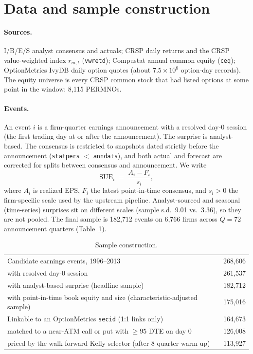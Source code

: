 \documentclass[11pt]{article}
\theoremstyle{definition}
\newcommand{\1}{\mathbf{1}}
\begin{document}
\section{Data and sample construction}\label{sec:data}

\paragraph{Sources.} I/B/E/S analyst consensus and actuals; CRSP daily returns and the CRSP
value-weighted index $r_{m,t}$ (\texttt{vwretd}); Compustat annual common equity
(\texttt{ceq}); OptionMetrics IvyDB daily option quotes (about $7.5\times10^8$ option-day
records). The equity universe is every CRSP common stock that had listed options at some
point in the window: 8{,}115 PERMNOs.

\paragraph{Events.} An event $i$ is a firm-quarter earnings announcement with a resolved
day-0 session (the first trading day at or after the announcement). The surprise is
analyst-based. The consensus is restricted to snapshots dated strictly before the
announcement (\texttt{statpers} $<$ \texttt{anndats}), and both actual and forecast are
corrected for splits between consensus and announcement. We write
\begin{equation}
  \mathrm{SUE}_i \;=\; \frac{A_i - F_i}{s_i},
\end{equation}
where $A_i$ is realized EPS, $F_i$ the latest point-in-time consensus, and $s_i>0$ the
firm-specific scale used by the upstream pipeline. Analyst-sourced and seasonal
(time-series) surprises sit on different scales (sample s.d.\ 9.01 vs.\ 3.36), so they are
not pooled. The final sample is 182{,}712 events on 6{,}766 firms across $Q=72$ announcement
quarters (Table~\ref{tab:sample}).

\begin{table}[h]\centering\small
\caption{Sample construction.}\label{tab:sample}
\begin{tabular}{lr}
\toprule
Candidate earnings events, 1996--2013 & 268{,}606 \\
\quad with resolved day-0 session & 261{,}537 \\
\quad with analyst-based surprise (headline sample) & 182{,}712 \\
\quad with point-in-time book equity and size (characteristic-adjusted sample) & 175{,}016 \\
Linkable to an OptionMetrics \texttt{secid} (1:1 links only) & 164{,}673 \\
\quad matched to a near-ATM call or put with $\geq 95$ DTE on day 0 & 126{,}008 \\
\quad priced by the walk-forward Kelly selector (after 8-quarter warm-up) & 113{,}927 \\
\bottomrule
\end{tabular}
\end{table}
\end{document}
